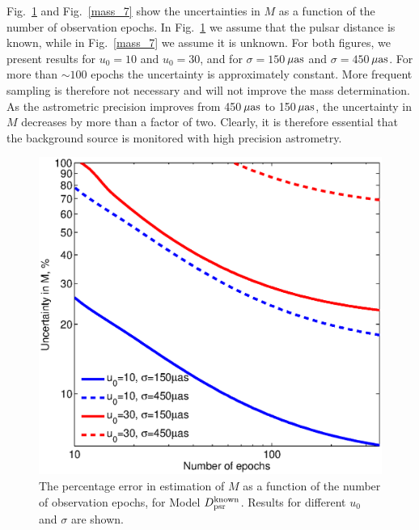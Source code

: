 \documentclass[iop,apj]{emulateapj}
\begin{document}
Fig.~\ref{mass_6} and Fig.~\ref{mass_7} show the uncertainties in $M$ as a function
of the number of observation epochs. In Fig.~\ref{mass_6} we assume that the pulsar distance is known,  
while in Fig.~\ref{mass_7} we assume it is unknown. For both figures, we present results for 
$u_0=10$ and $u_0=30$, and for $\sigma=150$\,$\rm{\mu as}$ and $\sigma=450$\,$\rm{\mu as}$. 
%
For more than $\sim 100$ epochs the uncertainty is approximately constant. More 
frequent sampling is therefore not necessary and will not improve the mass determination. 
As the astrometric precision improves from 450\,$\rm{\mu as}$ to 150\,$\rm{\mu as}$, 
the uncertainty in $M$ decreases by more than a factor of two. Clearly, it is therefore 
essential that the background source is monitored with high precision astrometry. 
%
\begin{figure}
\begin{center}
  \includegraphics[width=3.5 in]{mass_6.eps}
%
\caption{The percentage error in estimation of $M$ as a function of the number of observation epochs,
for Model $D_{\rm{psr}}^{\rm{known}}$. Results for different $u_0$ and $\sigma$ are shown.
}
\label{mass_6}
\end{center}
\end{figure}
%
%
\end{document}
